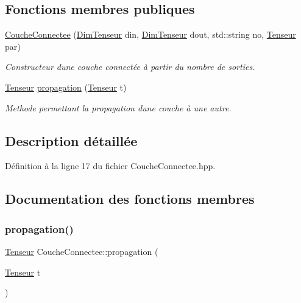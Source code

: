 \subsection*{Fonctions membres publiques}
\begin{DoxyCompactItemize}
\item 
\mbox{\label{class_couche_connectee_a57bb158c3d73fc0b19cc44cdc2946e0d}} 
\hyperlink{class_couche_connectee_a57bb158c3d73fc0b19cc44cdc2946e0d}{Couche\+Connectee} (\hyperlink{class_dim_tenseur}{Dim\+Tenseur} din, \hyperlink{class_dim_tenseur}{Dim\+Tenseur} dout, std\+::string no, \hyperlink{class_tenseur}{Tenseur} par)
\begin{DoxyCompactList}\small\item\em Constructeur d\textquotesingle{}une couche connectée à partir du nombre de sorties. \end{DoxyCompactList}\item 
\hyperlink{class_tenseur}{Tenseur} \hyperlink{class_couche_connectee_acd60c499c6c74f914795f45f3f8084d0}{propagation} (\hyperlink{class_tenseur}{Tenseur} t)
\begin{DoxyCompactList}\small\item\em Methode permettant la propagation d\textquotesingle{}une couche à une autre. \end{DoxyCompactList}\end{DoxyCompactItemize}


\subsection{Description détaillée}


Définition à la ligne 17 du fichier Couche\+Connectee.\+hpp.



\subsection{Documentation des fonctions membres}
\mbox{\label{class_couche_connectee_acd60c499c6c74f914795f45f3f8084d0}} 
\subsubsection{\texorpdfstring{propagation()}{propagation()}}
{\footnotesize\ttfamily \hyperlink{class_tenseur}{Tenseur} Couche\+Connectee\+::propagation (\begin{DoxyParamCaption}\item[{\hyperlink{class_tenseur}{Tenseur}}]{t }\end{DoxyParamCaption})\hspace{0.3cm}{\ttfamily [virtual]}}



